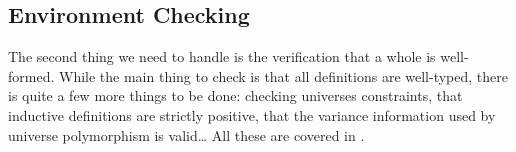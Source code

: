 \subsection{Environment Checking}

The second thing we need to handle is the verification that a whole 
is well-formed. While the main thing to check is that all definitions are well-typed,
there is quite a few more things to be done: checking universes constraints, that inductive
definitions are strictly positive, that the variance information used by universe polymorphism is
valid… All these are covered in .

